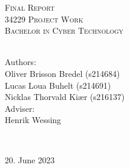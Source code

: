 \begin{titlepage}
\textsc{\Large Final Report}\\[1.5cm]

\textsc{\Large34229 Project Work\\ Bachelor in Cyber Technology}\\
\textsc{\Large }\\[1.5cm]


\begin{minipage}{0.5\textwidth}
        \begin{flushleft}
            \centering
            \large
            Authors:\\
            Oliver Brisson Bredel (s214684) \\[0.2cm]
            Lucas Loua Buhelt (s214691) \\[0.2cm]
            Nicklas Thorvald Kiær (s216137) \\[0.2cm]
            \hfill \break
            Adviser: 
            \\Henrik Wessing \\[0.2cm]
        \end{flushleft}
\end{minipage}
\\[1cm]
\vfill \vfill

{\large 20. June 2023}

\vfill

\end{titlepage}